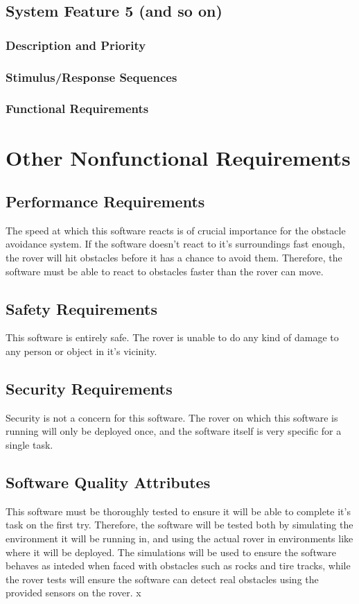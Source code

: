 \documentclass{scrreprt}
\begin{document}
\section{System Feature 5 (and so on)}

\subsection{Description and Priority}



\subsection{Stimulus/Response Sequences}


\subsection{Functional Requirements}


\chapter{Other Nonfunctional Requirements}

\section{Performance Requirements}
The speed at which this software reacts is of crucial importance for the obstacle avoidance system. If the software doesn't react to it's surroundings fast enough, the rover will hit obstacles before it has a chance to avoid them. Therefore, the software must be able to react to obstacles faster than the rover can move. 

\section{Safety Requirements}
This software is entirely safe. The rover is unable to do any kind of damage to any person or object in it's vicinity.

\section{Security Requirements}
Security is not a concern for this software. The rover on which this software is running will only be deployed once, and the software itself is very specific for a single task. 

\section{Software Quality Attributes}
This software must be thoroughly tested to ensure it will be able to complete it's task on the first try. Therefore, the software will be tested both by simulating the environment it will be running in, and using the actual rover in environments like where it will be deployed. The simulations will be used to ensure the software behaves as inteded when faced with obstacles such as rocks and tire tracks, while the rover tests will ensure the software can detect real obstacles using the provided sensors on the rover. x 
\end{document}
